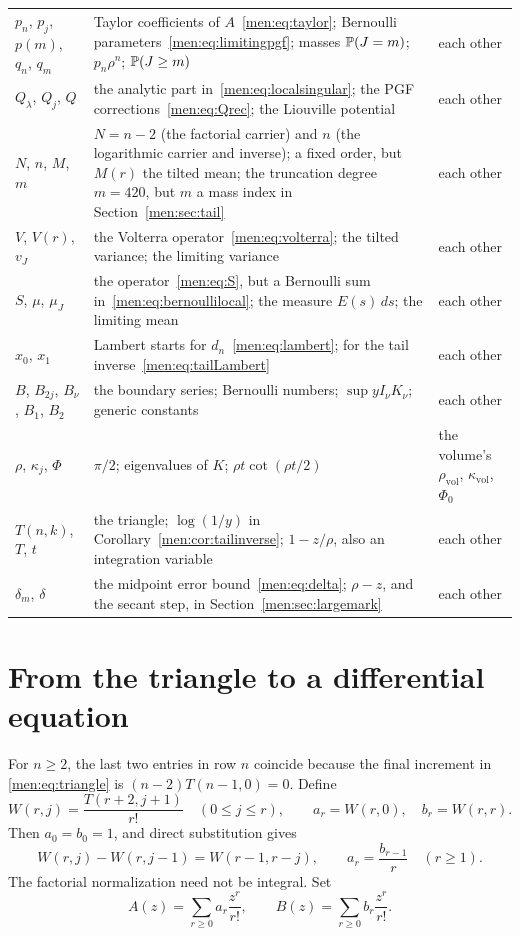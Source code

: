 \documentclass[11pt,letterpaper]{article}
\theoremstyle{remark}\newtheorem{remark}[theorem]{Remark}
\begin{document}
\begin{longtable}{@{}>{\raggedright\arraybackslash}p{0.95in}>{\raggedright\arraybackslash}p{3.3in}>{\raggedright\arraybackslash}p{1.85in}@{}}
$p_n$, $p_j$, $p(m)$, $q_n$, $q_m$ & Taylor coefficients of $A$~\eqref{men:eq:taylor}; Bernoulli parameters~\eqref{men:eq:limitingpgf}; masses $\mathbb P(J=m)$; $p_n\rho^n$; $\mathbb P(J\ge m)$ & each other\\
$Q_\lambda$, $Q_j$, $Q$ & the analytic part in~\eqref{men:eq:localsingular}; the PGF corrections~\eqref{men:eq:Qrec}; the Liouville potential & each other\\
$N$, $n$, $M$, $m$ & $N=n-2$ (the factorial carrier) and $n$ (the logarithmic carrier and inverse); a fixed order, but $M(r)$ the tilted mean; the truncation degree $m=420$, but $m$ a mass index in Section~\ref{men:sec:tail} & each other\\
$V$, $V(r)$, $v_J$ & the Volterra operator~\eqref{men:eq:volterra}; the tilted variance; the limiting variance & each other\\
$S$, $\mu$, $\mu_J$ & the operator~\eqref{men:eq:S}, but a Bernoulli sum in~\eqref{men:eq:bernoullilocal}; the measure $E(s)\,ds$; the limiting mean & each other\\
$x_0$, $x_1$ & Lambert starts for $d_n$~\eqref{men:eq:lambert}; for the tail inverse~\eqref{men:eq:tailLambert} & each other\\
$B$, $B_{2j}$, $B_\nu$, $B_1$, $B_2$ & the boundary series; Bernoulli numbers; $\sup yI_\nu K_\nu$; generic constants & each other\\
$\rho$, $\kappa_j$, $\Phi$ & $\pi/2$; eigenvalues of $K$; $\rho t\cot(\rho t/2)$ & the volume's $\rho_{\mathrm{vol}}$, $\kappa_{\mathrm{vol}}$, $\Phi_0$\\
$T(n,k)$, $T$, $t$ & the triangle; $\log(1/y)$ in Corollary~\ref{men:cor:tailinverse}; $1-z/\rho$, also an integration variable & each other\\
$\delta_m$, $\delta$ & the midpoint error bound~\eqref{men:eq:delta}; $\rho-z$, and the secant step, in Section~\ref{men:sec:largemark} & each other\\
\bottomrule
\end{longtable}
\endgroup

\section{From the triangle to a differential equation}\label{men:sec:ode}
For $n\ge2$, the last two entries in row $n$ coincide because the final increment in \eqref{men:eq:triangle} is $(n-2)T(n-1,0)=0$. Define
\begin{equation}\label{men:eq:normalization}
 W(r,j)=\frac{T(r+2,j+1)}{r!}\quad(0\le j\le r),\qquad
 a_r=W(r,0),\quad b_r=W(r,r).
\end{equation}
Then $a_0=b_0=1$, and direct substitution gives
\begin{equation}\label{men:eq:reflected}
 W(r,j)-W(r,j-1)=W(r-1,r-j),\qquad
 a_r=\frac{b_{r-1}}r\quad(r\ge1).
\end{equation}
The factorial normalization need not be integral. Set
\[
 A(z)=\sum_{r\ge0}a_r\frac{z^r}{r!},\qquad
 B(z)=\sum_{r\ge0}b_r\frac{z^r}{r!}.
\]
\end{document}
